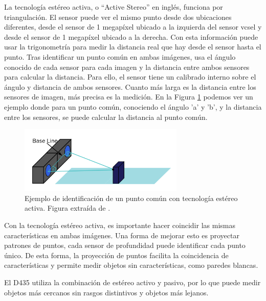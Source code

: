 La tecnología estéreo activa, o ``Active Stereo'' en inglés, funciona por triangulación.
El sensor puede ver el mismo punto desde dos ubicaciones diferentes, desde el sensor de 1 megapíxel ubicado a la izquierda del sensor \gls{vcsel} y desde el sensor de 1 megapíxel ubicado a la derecha.
Con esta información puede usar la trigonometría para medir la distancia real que hay desde el sensor hasta el punto.
Tras identificar un punto común en ambas imágenes, usa el ángulo conocido de cada sensor para cada imagen y la distancia entre ambos sensores para calcular la distancia.
Para ello, el sensor tiene un calibrado interno sobre el ángulo y distancia de ambos sensores.
Cuanto más larga es la distancia entre los sensores de imagen, más precisa es la medición.
En la Figura \ref{fig:ejemplo-sensor-estereo-activo} podemos ver un ejemplo donde para un punto común, conociendo el ángulo 'a' y 'b', y la distancia entre los sensores, se puede calcular la distancia al punto común.

\begin{figure}[h]
    \centering
    \includegraphics[width=0.7\textwidth]{archivos/ejemplo-sensor-estereo-activo.png}
    \caption{Ejemplo de identificación de un punto común con tecnología estéreo activa. Figura extraída de \cite{rafaelWhyte}.}
    \label{fig:ejemplo-sensor-estereo-activo}
\end{figure}

Con la tecnología estéreo activa, es importante hacer coincidir las mismas características en ambas imágenes.
Una forma de mejorar esto es proyectar patrones de puntos, cada sensor de profundidad puede identificar cada punto único.
De esta forma, la proyección de puntos facilita la coincidencia de características y permite medir objetos sin características, como paredes blancas.

El D435 utiliza la combinación de estéreo activo y pasivo, por lo que puede medir objetos más cercanos sin rasgos distintivos y objetos más lejanos.
